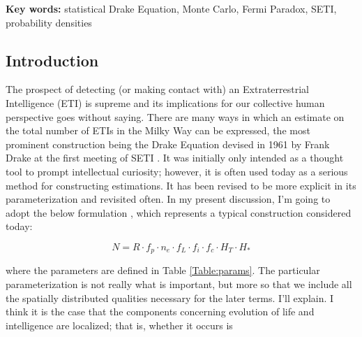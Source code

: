\documentclass[10pt,a4paper,final]{article}
\numberwithin{equation}{section}
\begin{document}
	\begin{flushright}
	\begin{minipage}[t]{0.85\textwidth}
		\par{\small{\textbf{Key words: } statistical Drake Equation, Monte Carlo, 
		Fermi Paradox, SETI, probability densities}\par}
	\end{minipage}
	\end{flushright}

	\vspace*{2\baselineskip}

	\begin{multicols}{2}[]
		
		\section{Introduction}
			
			The prospect of detecting (or making contact with) an Extraterrestrial
			Intelligence (ETI) is supreme and its implications for our collective
			human perspective goes without saying. There are many ways in which an
			estimate on the total number of ETIs in the Milky Way can be expressed,
			the most prominent construction being the Drake Equation devised in 1961 by
			Frank Drake at the first meeting of SETI \cite{drake}. It was initially only
			intended as a thought tool to prompt intellectual curiosity; however, it is
			often used today as a serious method for constructing estimations. It has
			been revised \cite{sagan} to be more explicit in its parameterization and
			revisited often. In my present discussion, I'm going to adopt the below
			formulation \cite{steven}, which represents a typical construction considered
			today:

			\begin{equation}
				N = R \cdot f_p \cdot n_e \cdot f_L \cdot f_i \cdot f_c \cdot
				H_T \cdot H_*
			\end{equation}

			\noindent
			where the parameters are defined in Table \ref{Table:params}. The particular
			parameterization is not really what is important, but more so that we include
			all the spatially distributed qualities necessary for the later terms. 
			I'll explain. I think it is the case that the components concerning evolution
			of life and intelligence are localized; that is, whether it occurs is
			

\end{multicols}
\end{document}
